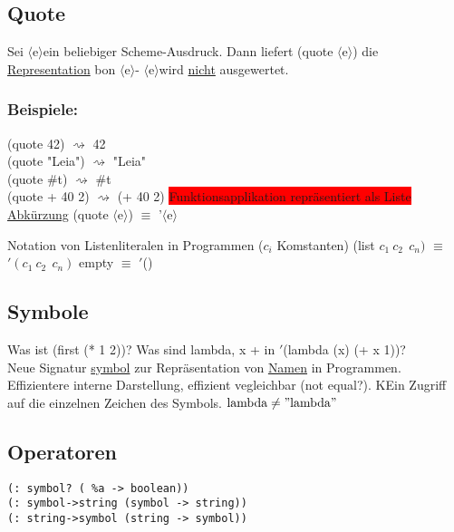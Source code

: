 \documentclass[a4paper,12pt]{article}
\newcommand{\la}{$\langle$}
\newcommand{\ra}{$\rangle$}
\begin{document}
\subsection{Quote}
Sei \la e\ra ein beliebiger Scheme-Ausdruck. Dann liefert (quote \la e\ra) die \uline{Representation} bon \la e\ra - \la e\ra wird \uline{nicht} ausgewertet.
\subsubsection{Beispiele:}
(quote 42) $\rightsquigarrow$ 42\\
(quote "Leia") $\rightsquigarrow$ "Leia"\\
(quote  \#t) $\rightsquigarrow$ \#t\\
(quote + 40 2) $\rightsquigarrow$ (+ 40 2) \colorbox{red}{Funktionsapplikation repräsentiert als Liste}\\
\uline{Abkürzung} (quote \la e\ra) $\equiv$ '\la e\ra

Notation von Listenliteralen in Programmen ($c_i$ Komstanten)
(list $c_1 \ c_2 \ \ c_n)$ $\equiv$ $'(c_1 \ c_2 \ \ c_n)$
empty $\equiv$ $'$()
\subsection{Symbole}
Was ist (first (* 1 2))? Was sind lambda, x + in $'$(lambda (x) (+ x 1))?\\
Neue Signatur \uline{symbol} zur Repräsentation von \uline{Namen} in Programmen. Effizientere interne Darstellung, effizient vegleichbar (not equal?). KEin Zugriff auf die einzelnen Zeichen des Symbols.
$\text{lambda}\neq "\text{lambda}"$
\subsection{Operatoren}
\begin{lstlisting}[style=customc]
(: symbol? ( %a -> boolean))
(: symbol->string (symbol -> string))
(: string->symbol (string -> symbol))
\end{lstlisting}
\end{document}
